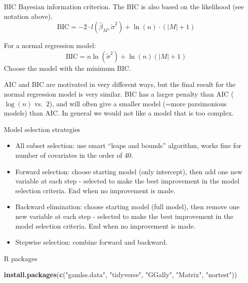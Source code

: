 \documentclass[
  ignorenonframetext,
]{beamer}
\newenvironment{Shaded}{\begin{snugshade}}{\end{snugshade}}
\newcommand{\FunctionTok}[1]{\textcolor[rgb]{0.13,0.29,0.53}{\textbf{#1}}}
\newcommand{\NormalTok}[1]{#1}
\newcommand{\StringTok}[1]{\textcolor[rgb]{0.31,0.60,0.02}{#1}}
\begin{document}
\begin{frame}
\begin{block}{BIC Bayesian information criterion.}
\label{bic-bayesian-information-criterion.}
The BIC is also based on the likelihood (see notation above).
\[\text{BIC} =-2 \cdot l(\hat{\beta}_M,\tilde{\sigma}^2)+\ln(n)\cdot (\lvert M\rvert +1)\]

For a normal regression model:
\[ \text{BIC}= n\ln(\tilde{\sigma}^2)+\ln(n)(\lvert M\rvert +1)\] Choose
the model with the minimum BIC.

AIC and BIC are motivated in very different ways, but the final result
for the normal regression model is very similar. BIC has a larger
penalty than AIC (\(\log(n)\) vs.~\(2\)), and will often give a smaller
model (=more parsimonious models) than AIC. In general we would not like
a model that is too complex.
\end{block}
\end{frame}

\begin{frame}
\begin{block}{Model selection strategies}
\label{model-selection-strategies}
\begin{itemize}
\item
  All subset selection: use smart ``leaps and bounds'' algorithm, works
  fine for number of covariates in the order of 40.
\item
  Forward selection: choose starting model (only intercept), then add
  one new variable at each step - selected to make the best improvement
  in the model selection criteria. End when no improvement is made.
\item
  Backward elimination: choose starting model (full model), then remove
  one new variable at each step - selected to make the best improvement
  in the model selection criteria. End when no improvement is made.
\item
  Stepwise selection: combine forward and backward.
\end{itemize}
\end{block}
\end{frame}

\begin{frame}[fragile]{R packages}
\label{r-packages}
\begin{Shaded}
\begin{Highlighting}[]
\FunctionTok{install.packages}\NormalTok{(}\FunctionTok{c}\NormalTok{(}\StringTok{"gamlss.data"}\NormalTok{, }\StringTok{"tidyverse"}\NormalTok{, }\StringTok{"GGally"}\NormalTok{, }\StringTok{"Matrix"}\NormalTok{, }\StringTok{"nortest"}\NormalTok{))}
\end{Highlighting}
\end{Shaded}
\end{frame}
\end{document}
